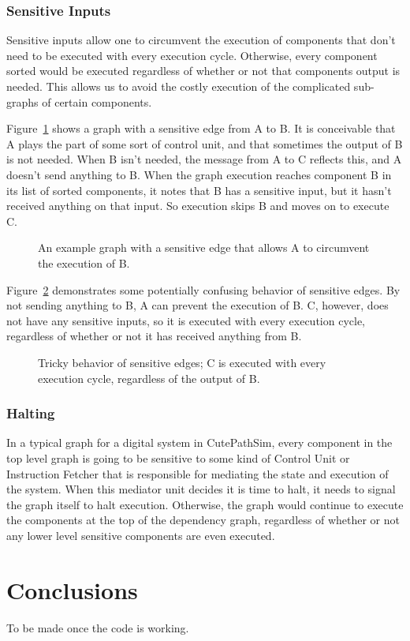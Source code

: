 \documentclass[12pt]{article}
\begin{document}
\subsubsection{Sensitive Inputs}
Sensitive inputs allow one to circumvent the execution of components that don't need to be executed with every execution cycle. Otherwise, every component sorted would be executed regardless of whether or not that components output is needed. This allows us to avoid the costly execution of the complicated sub-graphs of certain components.

Figure~\ref{examplesensitive} shows a graph with a sensitive edge from A to B. It is conceivable that A plays the part of some sort of control unit, and that sometimes the output of B is not needed. When B isn't needed, the message from A to C reflects this, and A doesn't send anything to B. When the graph execution reaches component B in its list of sorted components, it notes that B has a sensitive input, but it hasn't received anything on that input. So execution skips B and moves on to execute C.
\label{sec:sensitive}
\begin{figure}[h]
\centering
{}
\caption{An example graph with a sensitive edge that allows A to circumvent the execution of B.}
\label{examplesensitive}
\end{figure}

Figure~\ref{trickysensitive} demonstrates some potentially confusing behavior of sensitive edges. By not sending anything to B, A can prevent the execution of B. C, however, does not have any sensitive inputs, so it is executed with every execution cycle, regardless of whether or not it has received anything from B.

\begin{figure}[h]
\centering
{}
\caption{Tricky behavior of sensitive edges; C is executed with every execution cycle, regardless of the output of B.}
\label{trickysensitive}
\end{figure}
\subsubsection{Halting}
In a typical graph for a digital system in CutePathSim, every component in the top level graph is going to be sensitive to some kind of Control Unit or Instruction Fetcher that is responsible for mediating the state and execution of the system. When this mediator unit decides it is time to halt, it needs to signal the graph itself to halt execution. Otherwise, the graph would continue to execute the components at the top of the dependency graph, regardless of whether or not any lower level sensitive components are even executed.

\section{Conclusions}
To be made once the code is working.

\end{document}
